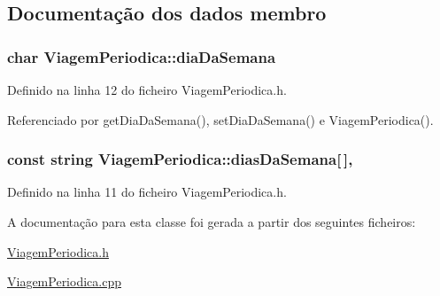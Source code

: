 \subsection{Documentação dos dados membro}
\hypertarget{class_viagem_periodica_ac53255ef9f3e6d862e2ac803d7e45206}{
\subsubsection[{dia\+Da\+Semana}]{\setlength{\rightskip}{0pt plus 5cm}char Viagem\+Periodica\+::dia\+Da\+Semana\hspace{0.3cm}{\ttfamily [private]}}}\label{class_viagem_periodica_ac53255ef9f3e6d862e2ac803d7e45206}


Definido na linha 12 do ficheiro Viagem\+Periodica.\+h.



Referenciado por get\+Dia\+Da\+Semana(), set\+Dia\+Da\+Semana() e Viagem\+Periodica().

\hypertarget{class_viagem_periodica_aec0deb1571c96da485be2d49e85d48a6}{
\subsubsection[{dias\+Da\+Semana}]{\setlength{\rightskip}{0pt plus 5cm}const string Viagem\+Periodica\+::dias\+Da\+Semana\mbox{[}$\,$\mbox{]}\hspace{0.3cm}{\ttfamily [static]}, {\ttfamily [private]}}}\label{class_viagem_periodica_aec0deb1571c96da485be2d49e85d48a6}


Definido na linha 11 do ficheiro Viagem\+Periodica.\+h.



A documentação para esta classe foi gerada a partir dos seguintes ficheiros\+:\begin{DoxyCompactItemize}
\item 
\hyperlink{_viagem_periodica_8h}{Viagem\+Periodica.\+h}\item 
\hyperlink{_viagem_periodica_8cpp}{Viagem\+Periodica.\+cpp}\end{DoxyCompactItemize}
